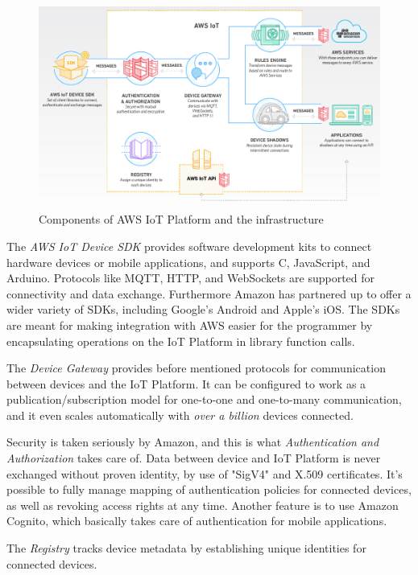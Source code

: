 \begin{figure}[h!]
	\centering
	\includegraphics[width=\textwidth]{figures/aws/infrastructure.png}
	\caption{Components of AWS IoT Platform and the infrastructure}
	\label{fig:aws:infrastructure}
\end{figure}

The \textit{AWS IoT Device SDK} provides software development kits to connect hardware devices or mobile applications, and supports C, JavaScript, and Arduino. Protocols like MQTT, HTTP, and WebSockets are supported for connectivity and data exchange. Furthermore Amazon has partnered up to offer a wider variety of SDKs, including Google's Android and Apple's iOS. The SDKs are meant for making integration with AWS easier for the programmer by encapsulating operations on the IoT Platform in library function calls. 

The \textit{Device Gateway} provides before mentioned protocols for communication between devices and the IoT Platform. It can be configured to work as a publication/subscription model for one-to-one and one-to-many communication, and it even scales automatically with \textit{over a billion} devices connected.

Security is taken seriously by Amazon, and this is what \textit{Authentication and Authorization} takes care of. Data between device and IoT Platform is never exchanged without proven identity, by use of "SigV4" and X.509 certificates. It's possible to fully manage mapping of authentication policies for connected devices, as well as revoking access rights at any time. Another feature is to use Amazon Cognito, which basically takes care of authentication for mobile applications.

The \textit{Registry} tracks device metadata by establishing unique identities for connected devices. 

